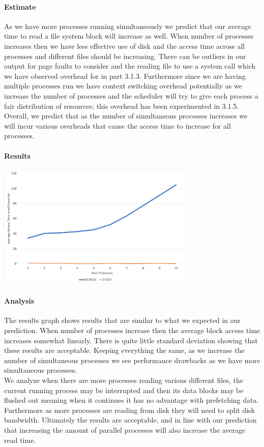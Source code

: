 \paragraph{Estimate}

As we have more processes running simultaneously we predict that our average time to read a file system block will increase as well. When number of processes increases then we have less effective use of disk and the access time across all processes and different files should be increasing. There can be outliers in our output for page faults to consider and the reading file to use a system call which we have observed overhead for in part 3.1.3. Furthermore since we are having multiple processes run we have context switching overhead potentially as we increase the number of processes and the scheduler will try to give each process a fair distribution of resources; this overhead has been experimented in 3.1.5. Overall, we predict that as the number of simultaneous processes increases we will incur various overheads that cause the access time to increase for all processes.

\paragraph{Results}

\includegraphics[width=9.5cm]{contention.png}

\paragraph{Analysis}

The results graph shows results that are similar to what we expected in our prediction. When number of processes increase then the average block access time increases somewhat linearly. There is quite little standard deviation showing that these results are acceptable. Keeping everything the same, as we increase the number of simultaneous processes we see performance drawbacks as we have more simultaneous processes. \\
We analyze when there are more processes reading various different files, the current running process may be interrupted and then its data blocks may be flushed out meaning when it continues it has no advantage with prefetching data. Furthermore as more processes are reading from disk they will need to split disk bandwidth. Ultimately the results are acceptable, and in line with our prediction that increasing the amount of parallel processes will also increase the average read time.

